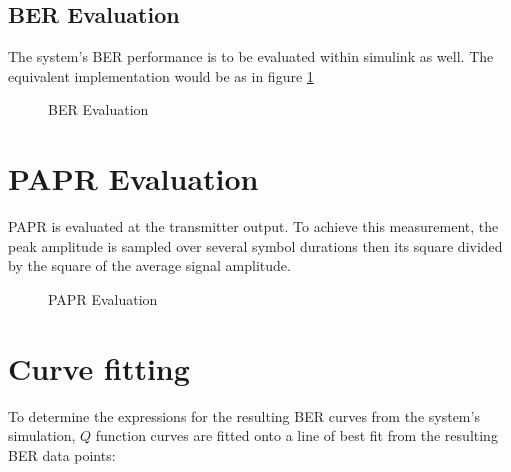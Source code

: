 \subsection{BER Evaluation}
The system's \gls{BER} performance is to be evaluated within \gls{simulink} as well. The equivalent implementation would be as in figure \ref{fig:ber_blk_meth}
\begin{figure}[htpb!]
	\centerline{\resizebox{15cm}{!}{}}
	\caption{\gls{BER} Evaluation}
	\label{fig:ber_blk_meth}
\end{figure}

\section{PAPR Evaluation}
\gls{PAPR} is evaluated at the transmitter output. To achieve this measurement, the peak amplitude is sampled over several symbol durations then its square divided by the square of the average signal amplitude.
\begin{figure}[!h]
	\centerline{\resizebox{10cm}{!}{}}
	\caption{\gls{PAPR} Evaluation}
	\label{fig:papr_blk_meth}
\end{figure}
\pagebreak
\section{Curve fitting}

To determine the expressions for  the resulting BER curves from the system's simulation, \(Q\) function curves are fitted onto a line of best fit from the resulting BER data points:
